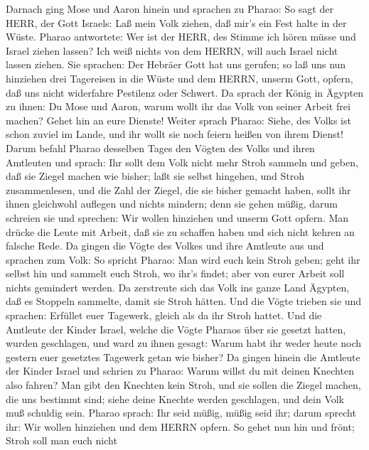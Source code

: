  Darnach ging Mose und Aaron hinein und sprachen zu Pharao:
So sagt der HERR, der Gott Israels: Laß mein Volk ziehen, daß mir's ein
Fest halte in der Wüste.  Pharao antwortete: Wer ist der
HERR, des Stimme ich hören müsse und Israel ziehen lassen? Ich weiß
nichts von dem HERRN, will auch Israel nicht lassen ziehen. 
Sie sprachen: Der Hebräer Gott hat uns gerufen; so laß uns nun hinziehen
drei Tagereisen in die Wüste und dem HERRN, unserm Gott, opfern, daß uns
nicht widerfahre Pestilenz oder Schwert.  Da sprach der
König in Ägypten zu ihnen: Du Mose und Aaron, warum wollt ihr das Volk
von seiner Arbeit frei machen? Gehet hin an eure Dienste! 
Weiter sprach Pharao: Siehe, des Volks ist schon zuviel im Lande, und
ihr wollt sie noch feiern heißen von ihrem Dienst!  Darum
befahl Pharao desselben Tages den Vögten des Volks und ihren Amtleuten
und sprach:  Ihr sollt dem Volk nicht mehr Stroh sammeln und
geben, daß sie Ziegel machen wie bisher; laßt sie selbst hingehen, und
Stroh zusammenlesen,  und die Zahl der Ziegel, die sie
bisher gemacht haben, sollt ihr ihnen gleichwohl auflegen und nichts
mindern; denn sie gehen müßig, darum schreien sie und sprechen: Wir
wollen hinziehen und unserm Gott opfern.  Man drücke die
Leute mit Arbeit, daß sie zu schaffen haben und sich nicht kehren an
falsche Rede.  Da gingen die Vögte des Volkes und ihre
Amtleute aus und sprachen zum Volk: So spricht Pharao: Man wird euch
kein Stroh geben;  geht ihr selbst hin und sammelt euch
Stroh, wo ihr's findet; aber von eurer Arbeit soll nichts gemindert
werden.  Da zerstreute sich das Volk ins ganze Land
Ägypten, daß es Stoppeln sammelte, damit sie Stroh hätten. 
Und die Vögte trieben sie und sprachen: Erfüllet euer Tagewerk, gleich
als da ihr Stroh hattet.  Und die Amtleute der Kinder
Israel, welche die Vögte Pharaos über sie gesetzt hatten, wurden
geschlagen, und ward zu ihnen gesagt: Warum habt ihr weder heute noch
gestern euer gesetztes Tagewerk getan wie bisher?  Da
gingen hinein die Amtleute der Kinder Israel und schrien zu Pharao:
Warum willst du mit deinen Knechten also fahren?  Man gibt
den Knechten kein Stroh, und sie sollen die Ziegel machen, die uns
bestimmt sind; siehe deine Knechte werden geschlagen, und dein Volk muß
schuldig sein.  Pharao sprach: Ihr seid müßig, müßig seid
ihr; darum sprecht ihr: Wir wollen hinziehen und dem HERRN opfern.
 So gehet nun hin und frönt; Stroh soll man euch nicht
